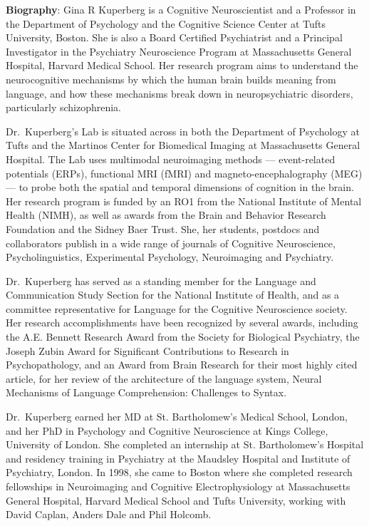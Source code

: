 \vspace{3em}\par 

\vfill
\noindent
{\bfseries Biography}: Gina R Kuperberg is a Cognitive Neuroscientist and a Professor in the
Department of Psychology and the Cognitive Science Center at Tufts University, Boston. She is also a
Board Certified Psychiatrist and a Principal Investigator in the Psychiatry Neuroscience Program at
Massachusetts General Hospital, Harvard Medical School. Her research program aims to understand the
neurocognitive mechanisms by which the human brain builds meaning from language, and how these
mechanisms break down in neuropsychiatric disorders, particularly schizophrenia.

Dr.\ Kuperberg's Lab is situated across in both the Department of Psychology at Tufts and the
Martinos Center for Biomedical Imaging at Massachusetts General Hospital. The Lab uses multimodal
neuroimaging methods –– event-related potentials (ERPs), functional MRI (fMRI) and
magneto-encephalography (MEG) –– to probe both the spatial and temporal dimensions of cognition in
the brain. Her research program is funded by an RO1 from the National Institute of Mental Health
(NIMH), as well as awards from the Brain and Behavior Research Foundation and the Sidney Baer
Trust. She, her students, postdocs and collaborators publish in a wide range of journals of
Cognitive Neuroscience, Psycholinguistics, Experimental Psychology, Neuroimaging and Psychiatry.

Dr.\ Kuperberg has served as a standing member for the Language and Communication Study Section for
the National Institute of Health, and as a committee representative for Language for the Cognitive
Neuroscience society. Her research accomplishments have been recognized by several awards, including
the A.E. Bennett Research Award from the Society for Biological Psychiatry, the Joseph Zubin Award
for Significant Contributions to Research in Psychopathology, and an Award from Brain Research for
their most highly cited article, for her review of the architecture of the language system, Neural
Mechanisms of Language Comprehension: Challenges to Syntax.

Dr.\ Kuperberg earned her MD at St. Bartholomew's Medical School, London, and her PhD in Psychology
and Cognitive Neuroscience at Kings College, University of London. She completed an internship at
St. Bartholomew's Hospital and residency training in Psychiatry at the Maudsley Hospital and
Institute of Psychiatry, London. In 1998, she came to Boston where she completed research
fellowships in Neuroimaging and Cognitive Electrophysiology at Massachusetts General Hospital,
Harvard Medical School and Tufts University, working with David Caplan, Anders Dale and Phil
Holcomb.
\newpage
